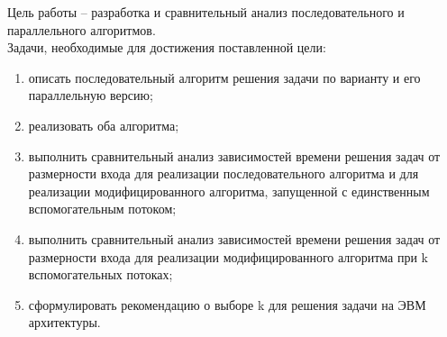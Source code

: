 
Цель работы -- разработка и сравнительный анализ последовательного и параллельного алгоритмов.\\

Задачи, необходимые для достижения поставленной цели:
\begin{enumerate}
	\item описать последовательный алгоритм решения задачи по варианту и его параллельную версию;
	\item реализовать оба алгоритма;
	\item выполнить сравнительный анализ зависимостей времени решения задач от размерности входа для реализации последовательного алгоритма и для реализации модифицированного алгоритма, запущенной с единственным вспомогательным потоком;
	\item выполнить сравнительный анализ зависимостей времени решения задач от размерности входа для реализации модифицированного алгоритма при k вспомогательных потоках;
	\item сформулировать рекомендацию о выборе k для решения задачи на ЭВМ архитектуры.
\end{enumerate}



%

